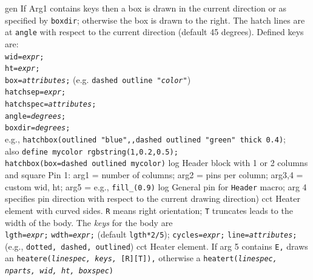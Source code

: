 %

%
  {gen}%
  { If Arg1 contains keys then a box is drawn in the current direction
    or as specified by {\tt boxdir}; otherwise the box is drawn to the right.
    The hatch lines are at {\tt angle} with respect to the current direction
    (default 45 degrees).
   Defined keys are:\\
    {\tt wid={\sl expr};}\\
    {\tt ht={\sl expr};}\\
    {\tt box={\sl attributes};} (e.g. {\tt dashed outline "{\sl color}"})\\
    {\tt hatchsep={\sl expr};}\\
    {\tt hatchspec={\sl attributes};}\\
    {\tt angle={\sl degrees};}\\
    {\tt boxdir={\sl degrees};}\\
 e.g.,
   {\tt hatchbox(outlined "blue",{},dashed outlined "green" thick 0.4)};\\
   also
   {\tt define mycolor \lbr{}rgbstring(1,0.2,0.5)\rbr;\\ 
        hatchbox(box=dashed outlined mycolor)}}%
%
  {log}%
  {Header block with 1 or 2 columns and square Pin 1:
   arg1 = number of columns;
   arg2 = pins per column;
   arg3,4 = custom wid, ht;
   arg5 = e.g., {\tt fill\_(0.9)}%
    }%
%
  {log}%
  {General pin for {\tt Header} macro; arg 4 specifies pin direction
   with respect to the current drawing direction)}%
%
  {cct}%
  {Heater element with curved sides.
    {\tt R} means right orientation;
    {\tt T} truncates leads to the width of the body.
    The {\sl keys} for the body are\\
    {\tt lgth={\sl expr};}
    {\tt wdth={\sl expr};} (default {\tt lgth*2/5});
    {\tt cycles={\sl expr};}%
    {\tt line={\sl attributes};} (e.g., {\tt dotted, dashed, outlined})}%
%
  {cct}%
  {Heater element. If arg 5 contains {\tt E,}
    draws an {\tt heatere({\sl linespec, keys,} [R][T]),}
    otherwise a
    {\tt heatert({\sl linespec, nparts, wid, ht, boxspec})}}%
%
